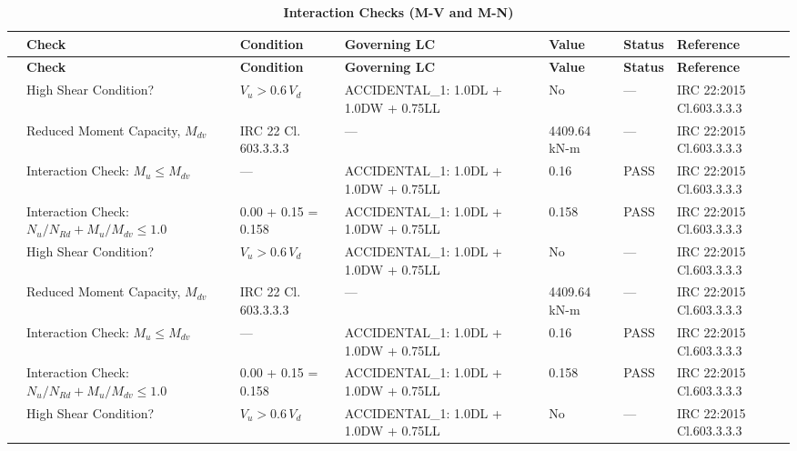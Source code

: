\documentclass[12pt,a4paper]{report}
\numberwithin{table}{chapter}
\numberwithin{figure}{chapter}
\begin{document}
\vspace{1em}
\begin{longtable}{|C{1.3cm}|C{2.5cm}|C{2.3cm}|>{\centering\arraybackslash}p{3.0cm}|C{2.4cm}|C{1.4cm}|C{2.4cm}|}
\caption{\textbf{Interaction Checks (M-V and M-N)}}
\hline
\textbf{} & \textbf{Check} & \textbf{Condition} & \textbf{Governing LC} & \textbf{Value} & \textbf{Status} & \textbf{Reference} \\[6pt]
\hline
\endfirsthead

\hline
\textbf{} & \textbf{Check} & \textbf{Condition} & \textbf{Governing LC} & \textbf{Value} & \textbf{Status} & \textbf{Reference} \\[6pt]
\hline
\endhead
{} & High Shear Condition? & $V_u > 0.6\,V_d$ & ACCIDENTAL\_\allowbreak{}1:\allowbreak{} 1.0DL + 1.0DW + 0.75LL & No & --- & IRC 22:2015 Cl.603.3.3.3 \\[6pt]
 & Reduced Moment Capacity, $M_{dv}$ & IRC 22 Cl. 603.3.3.3 & --- & 4409.64 kN-m & --- & IRC 22:2015 Cl.603.3.3.3 \\[6pt]
 & Interaction Check: $M_u \leq M_{dv}$ & --- & ACCIDENTAL\_\allowbreak{}1:\allowbreak{} 1.0DL + 1.0DW + 0.75LL & 0.16 & PASS & IRC 22:2015 Cl.603.3.3.3 \\[6pt]
 & Interaction Check: $N_u/N_{Rd} + M_u/M_{dv} \leq 1.0$ & 0.00 + 0.15 = 0.158 & ACCIDENTAL\_\allowbreak{}1:\allowbreak{} 1.0DL + 1.0DW + 0.75LL & 0.158 & PASS & IRC 22:2015 Cl.603.3.3.3 \\[6pt]
\hline
{} & High Shear Condition? & $V_u > 0.6\,V_d$ & ACCIDENTAL\_\allowbreak{}1:\allowbreak{} 1.0DL + 1.0DW + 0.75LL & No & --- & IRC 22:2015 Cl.603.3.3.3 \\[6pt]
 & Reduced Moment Capacity, $M_{dv}$ & IRC 22 Cl. 603.3.3.3 & --- & 4409.64 kN-m & --- & IRC 22:2015 Cl.603.3.3.3 \\[6pt]
 & Interaction Check: $M_u \leq M_{dv}$ & --- & ACCIDENTAL\_\allowbreak{}1:\allowbreak{} 1.0DL + 1.0DW + 0.75LL & 0.16 & PASS & IRC 22:2015 Cl.603.3.3.3 \\[6pt]
 & Interaction Check: $N_u/N_{Rd} + M_u/M_{dv} \leq 1.0$ & 0.00 + 0.15 = 0.158 & ACCIDENTAL\_\allowbreak{}1:\allowbreak{} 1.0DL + 1.0DW + 0.75LL & 0.158 & PASS & IRC 22:2015 Cl.603.3.3.3 \\[6pt]
\hline
{} & High Shear Condition? & $V_u > 0.6\,V_d$ & ACCIDENTAL\_\allowbreak{}1:\allowbreak{} 1.0DL + 1.0DW + 0.75LL & No & --- & IRC 22:2015 Cl.603.3.3.3 \\[6pt]

\end{longtable}
\end{document}
